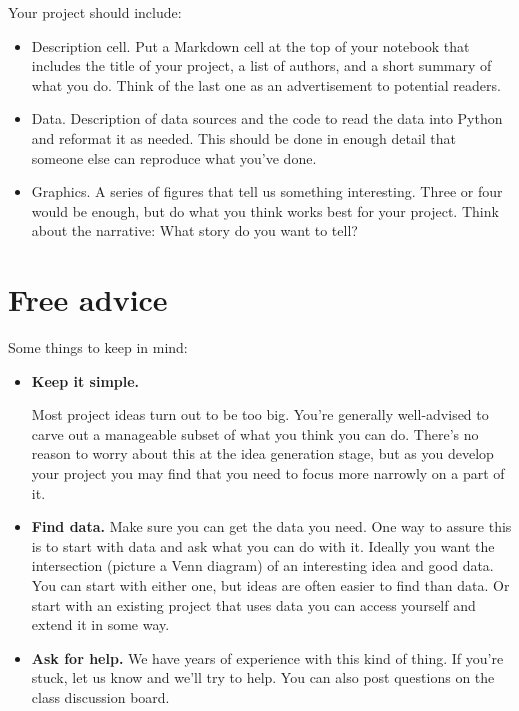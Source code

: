 \documentclass[11pt]{article}
\begin{document}
\begin{itemize}
Your project should include:
\begin{itemize}
\item Description cell.  Put a Markdown cell at the top of your notebook that
includes the title of your project, a list of authors, and a short summary of
what you do.  Think of the last one as an advertisement to potential readers.
\item Data.  Description of data sources and the code to read the data into
Python and reformat it as needed. This should be done in enough detail that
someone else can reproduce what you've done.
\item Graphics.  A series of figures that tell us something interesting. Three
or four would be enough, but do what you think works best for your project.
Think about the narrative:  What story do you want to tell?
\end{itemize}

\end{itemize}


\section*{Free advice}

Some things to keep in mind:
%
\begin{itemize}
\item {\bf Keep it simple.}

Most project ideas turn out to be too big.  You're generally well-advised to
carve out a manageable subset of what you think you can do. There's no reason to
worry about this at the idea generation stage, but as you develop your project
you may find that you need to focus more narrowly on a part of it.

\item {\bf Find data.}  Make sure you can get the data you need. One way to
assure this is to start with data and ask what you can do with it. Ideally you
want the intersection (picture a Venn diagram) of an interesting idea and good
data.  You can start with either one, but ideas are often easier to find than
data. Or start with an existing project that uses data you can access yourself
and extend it in some way.


\item {\bf Ask for help.}
We have years of experience with this kind of thing. If you're stuck, let us
know and we'll try to help. You can also post questions on the class discussion
board.

\end{itemize}
\end{document}
